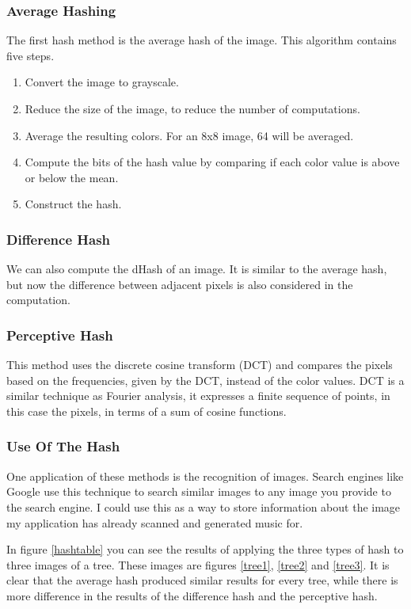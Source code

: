 \documentclass[12pt]{article}
\begin{document}
\subsubsection{Average Hashing}
The first hash method is the average hash of the image. This algorithm contains five steps.

\begin{enumerate}
        \item Convert the image to grayscale. 
        \item Reduce the size of the image, to reduce the number of computations.
        \item Average the resulting colors. For an 8x8 image, 64 will be averaged.
        \item Compute the bits of the hash value by comparing if each color value is above or below the mean.
        \item Construct the hash.
\end{enumerate}

\subsubsection{Difference Hash}
We can also compute the dHash of an image. It is similar to the average hash, but now the difference between adjacent pixels is also considered in the computation.

\subsubsection{Perceptive Hash}
This method uses the discrete cosine transform (DCT) and compares the pixels based on the frequencies, given by the DCT, instead of the color values.
DCT is a similar technique as Fourier analysis, it expresses a finite sequence of points, in this case the pixels, in terms of a sum of cosine functions.

\subsubsection{Use Of The Hash}
One application of these methods is the recognition of images. Search engines like Google use this technique to search similar images to any image you provide to the search engine. I could use this as a way to store information about the image my application has already scanned and generated music for.
\newline

In figure \ref{hashtable} you can see the results of applying the three types of hash to three images of a tree. These images are figures \ref{tree1}, \ref{tree2} and \ref{tree3}. It is clear that the average hash produced similar results for every tree, while there is more difference in the results of the difference hash and the perceptive hash.
\end{document}
